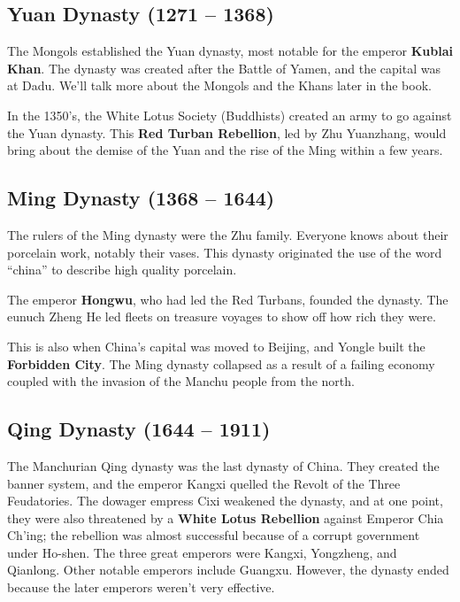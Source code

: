 \subsection*{Yuan Dynasty (1271 -- 1368)}

The Mongols established the Yuan dynasty, most notable for the emperor \textbf{Kublai Khan}.
The dynasty was created after the Battle of Yamen, and the capital was at Dadu.
We'll talk more about the Mongols and the Khans later in the book.

In the 1350's, the White Lotus Society (Buddhists) created an army to go against the Yuan dynasty.
This \textbf{Red Turban Rebellion}, led by Zhu Yuanzhang,
would bring about the demise of the Yuan and the rise of the Ming within a few years.

\subsection*{Ming Dynasty (1368 -- 1644)}

The rulers of the Ming dynasty were the Zhu family.
Everyone knows about their porcelain work, notably their vases.
This dynasty originated the use of the word ``china'' to describe high quality porcelain.

The emperor \textbf{Hongwu}, who had led the Red Turbans, founded the dynasty.
The eunuch Zheng He led fleets on treasure voyages to show off how rich they were.

This is also when China's capital was moved to Beijing, and Yongle built the \textbf{Forbidden City}.
The Ming dynasty collapsed as a result of a failing economy
coupled with the invasion of the Manchu people from the north.

\subsection*{Qing Dynasty (1644 -- 1911)}

The Manchurian Qing dynasty was the last dynasty of China.
They created the banner system, and the emperor Kangxi quelled the Revolt of the Three Feudatories.
The dowager empress Cixi weakened the dynasty, and at one point,
they were also threatened by a \textbf{White Lotus Rebellion} against Emperor Chia Ch'ing;
the rebellion was almost successful because of a corrupt government under Ho-shen.
The three great emperors were Kangxi, Yongzheng, and Qianlong.
Other notable emperors include Guangxu.
However, the dynasty ended because the later emperors weren't very effective.

